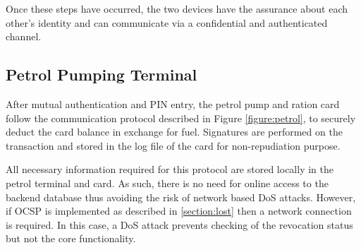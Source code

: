 \documentclass[a4paper,10pt]{llncs}
\begin{document}
Once these steps have occurred, the two devices have the assurance about each other's identity and can communicate via a confidential and authenticated channel.

\subsection{Petrol Pumping Terminal}
\label{Design:PetrolPT}
After mutual authentication and PIN entry, the petrol pump and ration card follow the communication protocol described in Figure \ref{figure:petrol}, to securely deduct the card balance in exchange for fuel. Signatures are performed on the transaction and stored in the log file of the card for non-repudiation purpose.

All necessary information required for this protocol are stored locally in the petrol terminal and card. As such, there is no need for online access to the backend database thus avoiding the risk of network based DoS attacks. However, if OCSP is implemented as described in \ref{section:lost} then a network connection is required. In this case, a DoS attack prevents checking of the revocation status but not the core functionality.

\usetikzlibrary{matrix,shapes,arrows,positioning,chains, calc}
\end{document}
